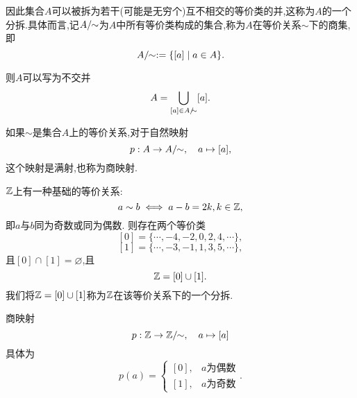 因此集合$A$可以被拆为若干(可能是无穷个)互不相交的等价类的并,这称为$A$的一个分拆.具体而言,记$A\mathbin{/}\!\!\sim$为$A$中所有等价类构成的集合,称为$A$在等价关系$\sim$下的商集,即
$$A\mathbin{/}\!\!\sim := \{ [a] \mid a \in A \}.$$

则$A$可以写为不交并$$A = \bigcup_{[a] \in A\mathbin{/}\!\!\sim} [a].$$

\begin{example}
    如果$\sim$是集合$A$上的等价关系,对于自然映射$$p:A \to A\mathbin{/}\!\!\sim , \quad a \mapsto [a],$$
    这个映射是满射,也称为商映射.
\end{example}

\begin{example}
    $\mathbb{Z}$上有一种基础的等价关系:$$a \sim b \iff a - b = 2k, k \in \mathbb{Z},$$即$a$与$b$同为奇数或同为偶数. 则存在两个等价类
    $$[0] = \{ \cdots, -4, -2, 0, 2, 4, \cdots \},$$
    $$[1] = \{ \cdots, -3, -1, 1, 3, 5, \cdots \},$$
    且$[0] \cap [1] = \varnothing$,且$$\mathbb{Z} = [0] \cup [1].$$
    我们将$\mathbb{Z} = [0] \cup [1]$称为$\mathbb{Z}$在该等价关系下的一个分拆.

    商映射$$p:\mathbb{Z} \to \mathbb{Z}\mathbin{/}\!\!\sim, \quad a \mapsto [a]$$具体为$$p(a) = \begin{cases}
            [0], & a \text{为偶数} \\
            [1], & a \text{为奇数}
        \end{cases}.$$
\end{example}



